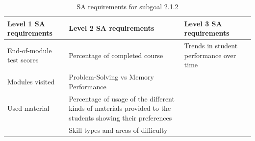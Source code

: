 \begin{table}[H]
\begin{center}
\begin{tabular}{ | m{5cm} | m{5cm}| m{5cm} | } 
  \hline
  \textbf{Level 1 SA requirements} & \textbf{Level 2 SA requirements}  & \textbf{Level 3 SA requirements}  \\ 
  \hline
  End-of-module test scores & Percentage of completed course & Trends in student performance over time \\ 
  \hline
  Modules visited & Problem-Solving vs Memory Performance & \\ 
  \hline
  Used material & Percentage of usage of the different kinds of materials provided to the students showing their preferences & \\ 
  \hline
   & Skill types and areas of difficulty & \\ 
  \hline
\end{tabular}
\end{center}
\caption{SA requirements for subgoal 2.1.2}
\end{table}